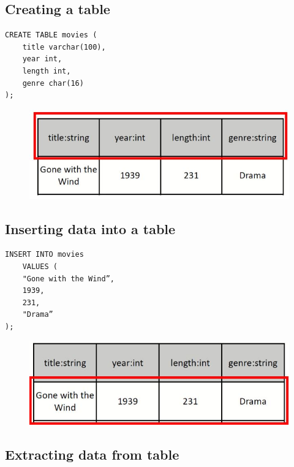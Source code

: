 \documentclass[conference]{IEEEtran}
\begin{document}
\subsection{Creating a table}

\begin{verbatim}
CREATE TABLE movies (
    title varchar(100),
    year int,
    length int,
    genre char(16)
);
\end{verbatim}
\begin{figure} [h!]
    \centering
    \includegraphics[scale=0.5]{Ex15.JPG}
\end{figure}

\subsection{Inserting data into a table}

\begin{verbatim}
INSERT INTO movies
    VALUES (
    "Gone with the Wind”,
    1939,
    231,
    "Drama”
);
\end{verbatim}
\begin{figure} [h!]
    \centering
    \includegraphics[scale=0.5]{Ex16.JPG}
\end{figure}

\pagebreak
\subsection{Extracting data from table}
\end{document}
